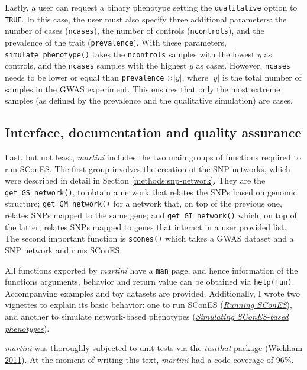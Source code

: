\documentclass[
  11pt,
]{env/yjiao}
\begin{document}
Lastly, a user can request a binary phenotype setting the \texttt{qualitative} option to \texttt{TRUE}. In this case, the user must also specify three additional parameters: the number of cases (\texttt{ncases}), the number of controls (\texttt{ncontrols}), and the prevalence of the trait (\texttt{prevalence}). With these parameters, \texttt{simulate\_phenotype()} takes the \texttt{ncontrols} samples with the lowest \(y\) as controls, and the \texttt{ncases} samples with the highest \(y\) as cases. However, \texttt{ncases} needs to be lower or equal than \texttt{prevalence} \(\times |y|\), where \(|y|\) is the total number of samples in the GWAS experiment. This ensures that only the most extreme samples (as defined by the prevalence and the qualitative simulation) are cases.

\hypertarget{martini-ui}{%
\subsection{Interface, documentation and quality assurance}\label{martini-ui}}

Last, but not least, \emph{martini} includes the two main groups of functions required to run SConES. The first group involves the creation of the SNP networks, which were described in detail in Section \ref{methods:snp-network}. They are the \texttt{get\_GS\_network()}, to obtain a network that relates the SNPs based on genomic structure; \texttt{get\_GM\_network()} for a network that, on top of the previous one, relates SNPs mapped to the same gene; and \texttt{get\_GI\_network()} which, on top of the latter, relates SNPs mapped to genes that interact in a user provided list. The second important function is \texttt{scones()} which takes a GWAS dataset and a SNP network and runs SConES.

All functions exported by \emph{martini} have a \texttt{man} page, and hence information of the functions arguments, behavior and return value can be obtained via \texttt{help(fun)}. Accompanying examples and toy datasets are provided. Additionally, I wrote two vignettes to explain its basic behavior: one to run SConES (\href{https://www.bioconductor.org/packages/release/bioc/vignettes/martini/inst/doc/scones_usage.html}{\emph{Running SConES}}), and another to simulate network-based phenotypes (\href{https://www.bioconductor.org/packages/release/bioc/vignettes/martini/inst/doc/simulate_phenotype.html}{\emph{Simulating SConES-based phenotypes}}).

\emph{martini} was thoroughly subjected to unit tests via the \emph{testthat} package (Wickham \protect\hyperlink{ref-wickham_testthat:_2011}{2011}). At the moment of writing this text, \emph{martini} had a code coverage of 96\%.
\end{document}
